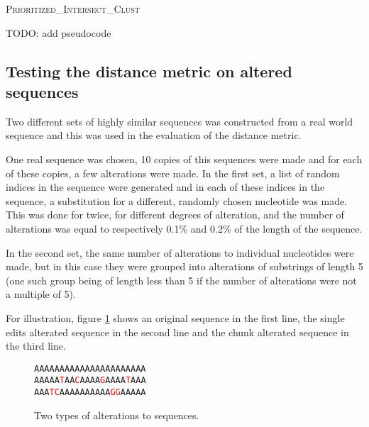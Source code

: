 \begin{algorithm}
  \caption{\textsc{Prioritized\_Intersect\_Clust}}
  \label{alg:prioritized_intersect_clust}
  \begin{algorithmic}[1]
    \Statex
    \State TODO: add pseudocode %
  \end{algorithmic}
  \label{alg:simple_clust}
\end{algorithm}


\subsection{Testing the distance metric on altered sequences}

Two different sets of highly similar sequences was constructed from a real
world sequence and this was used in the evaluation of the distance metric.

One real sequence was chosen, 10 copies of this sequences were made and for
each of these copies, a few alterations were made. In the first set, a list of
random indices in the sequence were generated and in each of these indices in
the sequence, a substitution for a different, randomly chosen nucleotide was
made. This was done for twice, for different degrees of alteration, and the
number of alterations was equal to respectively 0.1\% and 0.2\% of the length
of the sequence.

In the second set, the same number of alterations to individual nucleotides
were made, but in this case they were grouped into alterations of substrings of
length 5 (one such group being of length less than 5 if the number of
alterations were not a multiple of 5).

For illustration, figure \ref{fig:alterations} shows an original sequence in
the first line, the single edits alterated sequence in the second line and the
chunk alterated sequence in the third line.

\newcommand{\tc}[1]{\textcolor{red}{#1}}
\begin{figure}[H]
  \centering
  \texttt{AAAAAAAAAAAAAAAAAAAAAA} \\
  \texttt{AAAAA\tc{T}AA\tc{C}AAAA\tc{G}AAAA\tc{T}AAA} \\
  \texttt{AAA\tc{TC}AAAAAAAAAA\tc{GG}AAAAA}
  \caption{Two types of alterations to sequences.}
  \label{fig:alterations}
\end{figure}
